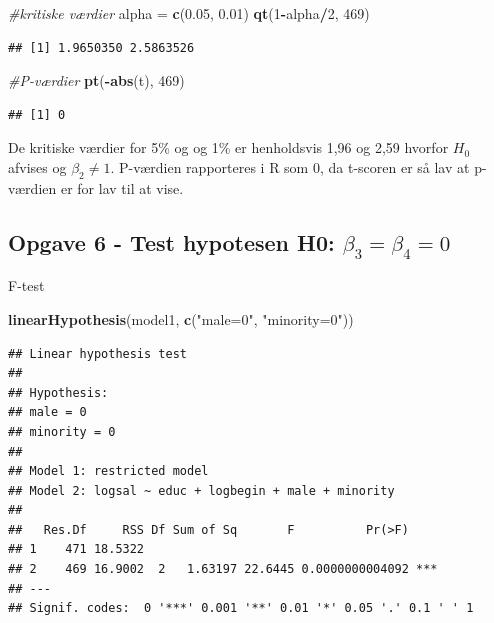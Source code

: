 \documentclass[
]{article}
\newenvironment{Shaded}{\begin{snugshade}}{\end{snugshade}}
\newcommand{\CommentTok}[1]{\textcolor[rgb]{0.56,0.35,0.01}{\textit{#1}}}
\newcommand{\DecValTok}[1]{\textcolor[rgb]{0.00,0.00,0.81}{#1}}
\newcommand{\FloatTok}[1]{\textcolor[rgb]{0.00,0.00,0.81}{#1}}
\newcommand{\FunctionTok}[1]{\textcolor[rgb]{0.13,0.29,0.53}{\textbf{#1}}}
\newcommand{\NormalTok}[1]{#1}
\newcommand{\OtherTok}[1]{\textcolor[rgb]{0.56,0.35,0.01}{#1}}
\newcommand{\SpecialCharTok}[1]{\textcolor[rgb]{0.81,0.36,0.00}{\textbf{#1}}}
\newcommand{\StringTok}[1]{\textcolor[rgb]{0.31,0.60,0.02}{#1}}
\begin{document}
\begin{Shaded}
\begin{Highlighting}[]
\CommentTok{\#kritiske værdier}
\NormalTok{alpha }\OtherTok{=} \FunctionTok{c}\NormalTok{(}\FloatTok{0.05}\NormalTok{, }\FloatTok{0.01}\NormalTok{)}
\FunctionTok{qt}\NormalTok{(}\DecValTok{1}\SpecialCharTok{{-}}\NormalTok{alpha}\SpecialCharTok{/}\DecValTok{2}\NormalTok{, }\DecValTok{469}\NormalTok{)}
\end{Highlighting}
\end{Shaded}

\begin{verbatim}
## [1] 1.9650350 2.5863526
\end{verbatim}

\begin{Shaded}
\begin{Highlighting}[]
\CommentTok{\#P{-}værdier}
\FunctionTok{pt}\NormalTok{(}\SpecialCharTok{{-}}\FunctionTok{abs}\NormalTok{(t), }\DecValTok{469}\NormalTok{)}
\end{Highlighting}
\end{Shaded}

\begin{verbatim}
## [1] 0
\end{verbatim}

De kritiske værdier for 5\% og og 1\% er henholdsvis 1,96 og 2,59
hvorfor \(H_0\) afvises og \(\beta_2 \neq 1\). P-værdien rapporteres i R
som 0, da t-scoren er så lav at p-værdien er for lav til at vise.

\hypertarget{opgave-6---test-hypotesen-h0-beta_3-beta_4-0}{%
\subsection{\texorpdfstring{Opgave 6 - Test hypotesen H0:
\(\beta_3 = \beta_4 = 0\)}{Opgave 6 - Test hypotesen H0: \textbackslash beta\_3 = \textbackslash beta\_4 = 0}}\label{opgave-6---test-hypotesen-h0-beta_3-beta_4-0}}

F-test

\begin{Shaded}
\begin{Highlighting}[]
\FunctionTok{linearHypothesis}\NormalTok{(model1, }\FunctionTok{c}\NormalTok{(}\StringTok{"male=0"}\NormalTok{, }\StringTok{"minority=0"}\NormalTok{))}
\end{Highlighting}
\end{Shaded}

\begin{verbatim}
## Linear hypothesis test
## 
## Hypothesis:
## male = 0
## minority = 0
## 
## Model 1: restricted model
## Model 2: logsal ~ educ + logbegin + male + minority
## 
##   Res.Df     RSS Df Sum of Sq       F          Pr(>F)    
## 1    471 18.5322                                         
## 2    469 16.9002  2   1.63197 22.6445 0.0000000004092 ***
## ---
## Signif. codes:  0 '***' 0.001 '**' 0.01 '*' 0.05 '.' 0.1 ' ' 1
\end{verbatim}
\end{document}
